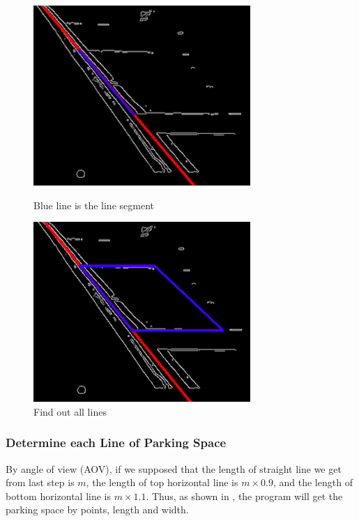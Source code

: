 \documentclass[runningheads,a4paper]{llncs}
\begin{document}
\begin{figure}[tbp]
	\begin{minipage}{.4\textwidth}
		\centering
		\includegraphics[scale=0.5,natwidth=311,natheight=258]{Figures/lineSegment.png}
		\caption{Blue line is the line segment}
		\label{fig:lineSegment}
	\end{minipage}
	\hspace{0.5in}
	\begin{minipage}{.4\textwidth}
		\centering
		\includegraphics[scale=0.5,natwidth=311,natheight=258]{Figures/fourLines.png}
		\caption{Find out all lines}
		\label{fig:fourLines}
	\end{minipage}
\end{figure}

\subsubsection{Determine each Line of Parking Space}

By angle of view (AOV)\cite{AOV}, if we supposed that the length of
straight line we get from last step is $m$, the length of top horizontal
line is $m \times 0.9$, and the length of bottom horizontal line is $m \times 1.1$.
Thus, as shown in , the program will get the parking
space by points, length and width.
\end{document}
